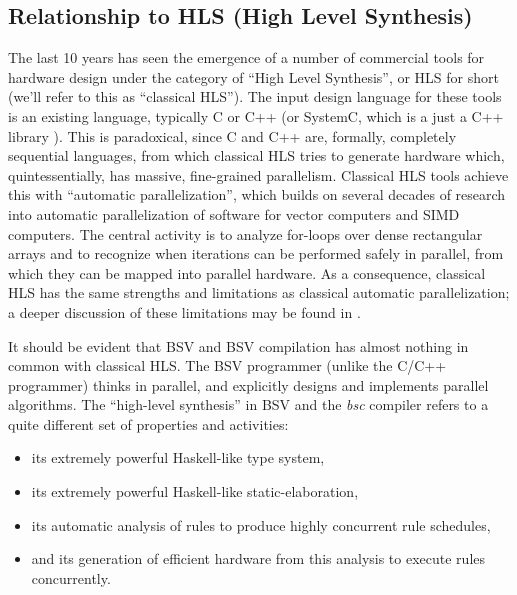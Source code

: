 \documentclass[11pt]{article}
\begin{document}

\subsection{Relationship to HLS (High Level Synthesis)}

The last 10 years has seen the emergence of a number of commercial
tools for hardware design under the category of ``High Level
Synthesis'', or HLS for short \cite{Coussy2009} (we'll refer to this
as ``classical HLS'').  The input design language for these tools is
an existing language, typically C or C++ (or SystemC, which is a just
a C++ library \cite{IEEESystemC2011a}).  This is paradoxical, since C
and C++ are, formally, completely sequential languages, from which
classical HLS tries to generate hardware which, quintessentially, has
massive, fine-grained parallelism.  Classical HLS tools achieve this
with ``automatic parallelization'', which builds on several decades of
research into automatic parallelization of software for vector
computers and SIMD computers.  The central activity is to analyze
for-loops over dense rectangular arrays and to recognize when
iterations can be performed safely in parallel, from which they can be
mapped into parallel hardware.  As a consequence, classical HLS has
the same strengths and limitations as classical automatic
parallelization; a deeper discussion of these limitations may be found
in \cite{Edwards2005a}.

It should be evident that BSV and BSV compilation has almost nothing
in common with classical HLS.  The BSV programmer (unlike the C/C++
programmer) thinks in parallel, and explicitly designs and implements
parallel algorithms.  The ``high-level synthesis'' in BSV and the
\emph{bsc} compiler refers to a quite different set of properties and
activities:

\begin{itemize}

\item its extremely powerful Haskell-like type system,

\item its extremely powerful Haskell-like static-elaboration,

\item its automatic analysis of rules to produce highly concurrent rule schedules,

\item and its generation of efficient hardware from this analysis to
execute rules concurrently.

\end{itemize}
\end{document}
